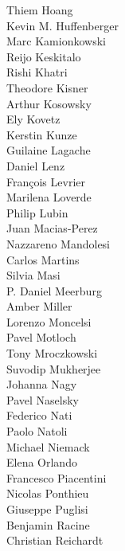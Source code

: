 \documentclass[PICOReport.tex]{subfiles}
\begin{document}
{\begin{multicols}{4}
Thiem Hoang                     \\
Kevin M. Huffenberger           \\
Marc Kamionkowski               \\
Reijo Keskitalo                 \\
Rishi Khatri                    \\
Theodore Kisner                 \\
Arthur Kosowsky                 \\
Ely Kovetz                      \\
Kerstin Kunze                   \\
Guilaine Lagache                \\
Daniel Lenz                     \\
Fran\c{c}ois Levrier            \\
Marilena Loverde                \\
Philip Lubin                    \\
Juan Macias-Perez               \\
Nazzareno Mandolesi             \\
Carlos Martins                  \\
Silvia Masi                     \\
P. Daniel Meerburg              \\
Amber Miller                    \\
Lorenzo Moncelsi                \\
Pavel Motloch                   \\
Tony Mroczkowski                \\
Suvodip Mukherjee               \\
Johanna Nagy                    \\
Pavel Naselsky                  \\
Federico Nati                   \\
Paolo Natoli                    \\
Michael Niemack                 \\
Elena Orlando                   \\
Francesco Piacentini            \\
Nicolas Ponthieu                \\
Giuseppe Puglisi                \\
Benjamin Racine                 \\
Christian Reichardt             \\

\end{multicols}}
\end{document}
